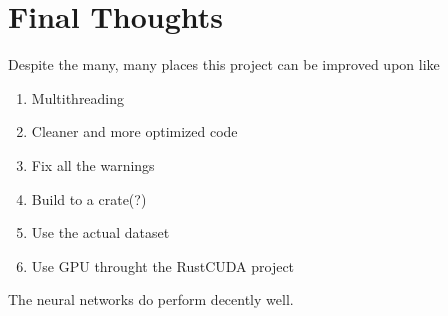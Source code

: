 \documentclass[a4paper]{article}
\begin{document}
\section{Final Thoughts}
\label{sec:org967720f}
Despite the many, many places this project can be improved upon like
\begin{enumerate}
\item Multithreading
\item Cleaner and more optimized code
\item Fix all the warnings
\item Build to a crate(?)
\item Use the actual dataset
\item Use GPU throught the RustCUDA project
\end{enumerate}

The neural networks do perform decently well.
\end{document}
